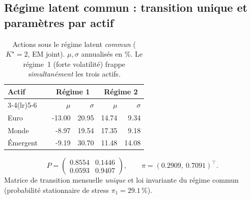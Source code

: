 \documentclass[11pt,a4paper]{article}
\theoremstyle{definition}
\newcommand{\transp}{^{\!\top}}
\begin{document}
\subsection{Régime latent commun : transition unique et paramètres par actif}
\begin{table}[H]\centering\small\renewcommand{\arraystretch}{1.25}\setlength{\tabcolsep}{6pt}
\begin{tabularx}{\textwidth}{@{}l X r r r r@{}}
\toprule
\textbf{Actif} & \textbf{} & \multicolumn{2}{c}{\textbf{Régime 1}} & \multicolumn{2}{c}{\textbf{Régime 2}}\\
\cmidrule(lr){3-4}\cmidrule(lr){5-6}
\textbf{} & & $\mu$ & $\sigma$ & $\mu$ & $\sigma$\\
\midrule
Euro & & -13.00 & 20.95 & 14.74 & 9.34\\
Monde & & -8.97 & 19.54 & 17.35 & 9.18\\
Émergent & & -9.19 & 30.70 & 11.48 & 14.08\\
\bottomrule\end{tabularx}
\caption{Actions sous le régime latent \emph{commun} ($K^\star=2$, EM joint). $\mu,\sigma$ annualisés en \%. Le régime~1 (forte volatilité) frappe \emph{simultanément} les trois actifs.}\label{tab:res-common}
\end{table}
\begin{definitionbox}
\[ P=\begin{pmatrix}0.8554 & 0.1446\\0.0593 & 0.9407\end{pmatrix},\qquad \pi=(0.2909,\ 0.7091)\transp. \]
Matrice de transition mensuelle \emph{unique} et loi invariante du régime commun (probabilité stationnaire de stress $\pi_1=29.1\,\%$).
\end{definitionbox}
\end{document}
